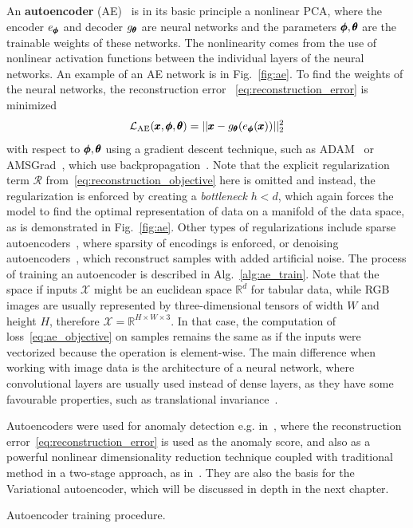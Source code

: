 An \textbf{autoencoder} (AE)~\cite{kramer1991nonlinear} is in its basic principle a nonlinear PCA, where the encoder $e_{\pmb{{\phi}}}$ and decoder $g_{\pmb{{\theta}}}$ are neural networks and the parameters $\pmb{{\phi}},\pmb{{\theta}}$ are the trainable weights of these networks. The nonlinearity comes from the use of nonlinear activation functions between the individual layers of the neural networks. An example of an AE network is in Fig.~\ref{fig:ae}.  To find the weights of the neural networks, the reconstruction error ~\eqref{eq:reconstruction_error} is minimized 
\begin{equation} \label{eq:ae_objective}
\mathcal{L}_{\text{AE}}(\pmb{{x}},\pmb{{\phi}},\pmb{{\theta}}) = \vert \vert \pmb{{x}} - g_{\pmb{{\theta}}}(e_{\pmb{{\phi}}}(\pmb{{x}})) \vert \vert_2^2
\end{equation}
with respect to $\pmb{{\phi}},\pmb{{\theta}}$ using a gradient descent technique, such as ADAM~\cite{kingma2014adam} or AMSGrad~\cite{reddi2019convergence}, which use backpropagation~\cite{werbos1982applications}. Note that the explicit regularization term $\mathcal{R}$ from~\eqref{eq:reconstruction_objective} here is omitted and instead, the regularization is enforced by creating a \textit{bottleneck} $h < d$, which again forces the model to find the optimal representation of data on a manifold of the data space, as is demonstrated in Fig.~\ref{fig:ae}. Other types of regularizations include sparse autoencoders~\cite{deng2013sparse}, where sparsity of encodings is enforced, or denoising autoencoders~\cite{lu2013speech}, which reconstruct samples with added artificial noise. The process of training an autoencoder is described in Alg.~\ref{alg:ae_train}. Note that the space if inputs $\mathcal{X}$ might be an euclidean space $\mathbb{R}^d$ for tabular data, while RGB images are usually represented by three-dimensional tensors of width $W$ and height $H$, therefore $\mathcal{X} = \mathbb{R}^{H \times W\times3}$. In that case, the computation of loss~\eqref{eq:ae_objective} on samples remains the same as if the inputs were vectorized because the operation is element-wise. The main difference when working with image data is the architecture of a neural network, where convolutional layers are usually used instead of dense layers, as they have some favourable properties, such as translational invariance~\cite{kauderer2017quantifying}.

Autoencoders were used for anomaly detection e.g. in~\cite{sakurada2014anomaly,thompson2002implicit}, where the reconstruction error~\eqref{eq:reconstruction_error} is used as the anomaly score, and also as a powerful nonlinear dimensionality reduction technique coupled with traditional method in a two-stage approach, as in~\cite{erfani2016high, amarbayasgalan2018unsupervised}. They are also the basis for the Variational autoencoder, which will be discussed in depth in the next chapter.

\begin{algorithm}
\caption{Autoencoder training procedure.}
\label{alg:ae_train}
\end{algorithm}

